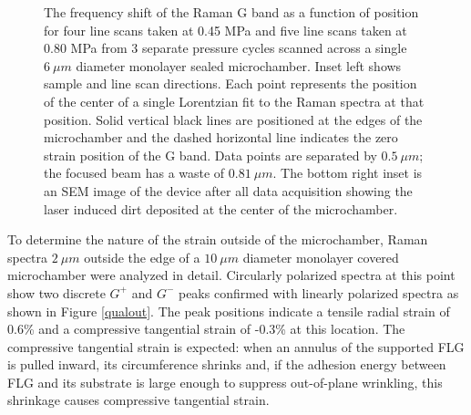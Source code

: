 \begin{figure}
\begin{center}
\begin{tikzpicture}[scale=1]
	\end{tikzpicture}
\end{center}
\caption{\label{qualresults}The frequency shift of the Raman G band as a function of position for four line scans taken at 0.45 MPa and five line scans taken at 0.80 MPa from 3 separate pressure cycles scanned across a single $6 \ \mu m$ diameter monolayer sealed microchamber. Inset left shows sample and line scan directions.  Each point represents the position of the center of a single Lorentzian fit to the Raman spectra at that position.  Solid vertical black lines are positioned at the edges of the microchamber and the dashed horizontal line indicates the zero strain position of the G band.  Data points are separated by $0.5 \ \mu m$; the focused beam has a waste of $0.81 \ \mu m$.  The bottom right inset is an SEM image of the device after all data acquisition showing the laser induced dirt deposited at the center of the microchamber.}
\end{figure}

To determine the nature of the strain outside of the microchamber, Raman spectra $2 \ \mu m$ outside the edge of a $10 \ \mu m$ diameter monolayer covered microchamber were analyzed in detail.  Circularly polarized spectra at this point show two discrete $G^+$ and $G^-$ peaks confirmed with linearly polarized spectra as shown in Figure \ref{qualout}.  The peak positions indicate a tensile radial strain of 0.6\% and a compressive tangential strain of -0.3\% at this location.  The compressive tangential strain is expected: when an annulus of the supported FLG is pulled inward, its circumference shrinks and, if the adhesion energy between FLG and its substrate is large enough to suppress out-of-plane wrinkling, this shrinkage causes compressive tangential strain.

